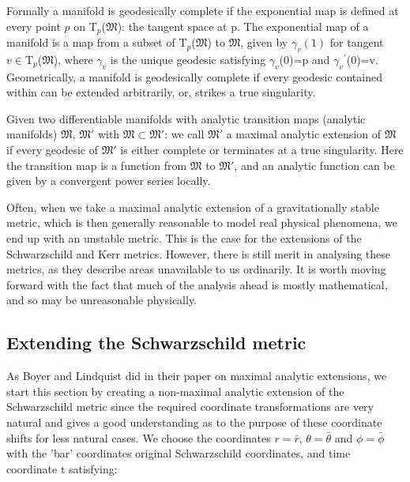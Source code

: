 \documentclass[oneside,openright,frontopenright, singlespacing]{dmathesis}
\begin{document}
\vspace{1em}
	Formally a manifold is geodesically complete if the exponential map is defined at every point $p$ on T$_p$($\mathfrak{M}$): the tangent space at p. The exponential map of a manifold is a map from a subset of T$_p$($\mathfrak{M}$) to $\mathfrak{M}$, given by $\gamma_v(1)$ for tangent $v\in$T$_p$($\mathfrak{M}$), where $\gamma_v$ is the unique geodesic satisfying $\gamma_v$(0)=p and ${\gamma_v}^{'}$(0)=v. Geometrically, a manifold is geodesically complete if every geodesic contained within can be extended arbitrarily, or, strikes a true singularity.

\vspace{1em}
	Given two differentiable manifolds with analytic transition maps (analytic manifolds) $\mathfrak{M}$, $\mathfrak{M}'$ with $\mathfrak{M} \subset \mathfrak{M}'$: we call $\mathfrak{M}'$ a maximal analytic extension of $\mathfrak{M}$ if every geodesic of $\mathfrak{M}'$ is either complete or terminates at a true singularity. Here the transition map is a function from $\mathfrak{M}$ to $\mathfrak{M}'$, and an analytic function can be given by a convergent power series locally.

\vspace{1em}
	Often, when we take a maximal analytic extension of a gravitationally stable metric, which is then generally reasonable to model real physical phenomena, we end up with an unstable metric. This is the case for the extensions of the Schwarzschild and Kerr metrics. However, there is still merit in analysing these metrics, as they describe areas unavailable to us ordinarily. It is worth moving forward with the fact that much of the analysis ahead is mostly mathematical, and so may be unreasonable physically.

\subsection{Extending the Schwarzschild metric}\label{subsec:Subsection6.1.1}

\vspace{1em}
	As Boyer and Lindquist did in their paper on maximal analytic extensions\cite{boyer1967maximal}, we start this section by creating a non-maximal analytic extension of the Schwarzschild metric since the required coordinate transformations are very natural and gives a good understanding as to the purpose of these coordinate shifts for less natural cases. We choose the coordinates $r=\bar{r}$, $\theta=\bar{\theta}$ and $\phi=\bar{\phi}$ with the 'bar' coordinates original Schwarzschild coordinates, and time coordinate t satisfying:
\end{document}
